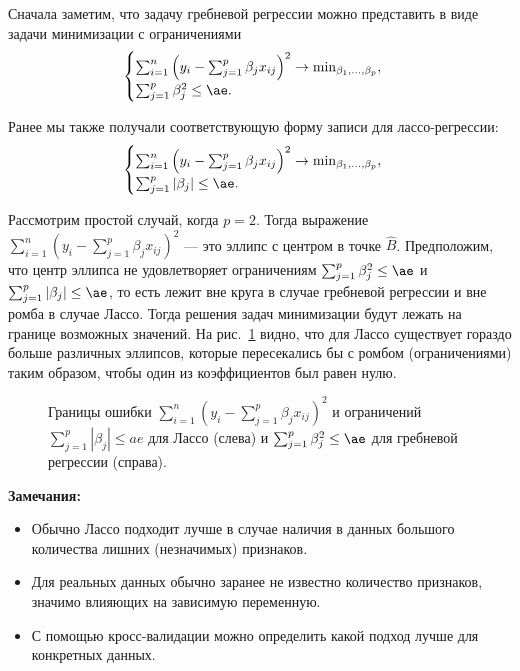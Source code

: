 \documentclass[11pt,colorlinks=true]{article}
\begin{document}
Сначала заметим, что задачу гребневой регрессии можно  представить в виде задачи минимизации с ограничениями
\begin{equation*}
\begin{cases}
\sum_{i=1}^{n}
\left(
y_{i}
-
\sum_{j=1}^{p}\beta_{j}x_{ij}
\right)^{2}
\to
\min_{\beta_{1},\ldots,\beta_{p}},\\
\sum_{j=1}^{p}\beta_{j}^{2}\leq\ae.
\end{cases}
\end{equation*}


Ранее мы также получали соответствующую форму записи для лассо-регрессии:
\begin{equation*}%
\begin{cases}
\sum_{i=1}^{n}
\left(
y_{i}
-
\sum_{j=1}^{p}\beta_{j}x_{ij}
\right)^{2}
\to
\min_{\beta_{1},\ldots,\beta_{p}},\\
\sum_{j=1}^{p}|\beta_{j}|\leq\ae.
\end{cases}
\end{equation*}

Рассмотрим простой случай, когда $p = 2$. Тогда выражение $\sum_{i=1}^n(y_i - \sum_{j=1}^p \beta_j x_{ij})^2$ --- это эллипс с центром в точке $\hat{B}$. Предположим, что центр эллипса не удовлетворяет ограничениям $\sum_{j = 1}^p \beta_j^2 \leq\ae$ и $\sum_{j = 1}^p |\beta_j| \leq \ae$, то есть лежит вне круга в случае гребневой регрессии и вне ромба в случае Лассо. Тогда решения задач минимизации будут лежать на границе возможных значений. На рис.~\ref{lasso_pic} видно, что для Лассо существует гораздо больше различных эллипсов, которые пересекались бы с ромбом (ограничениями) таким образом, чтобы один из коэффициентов был равен нулю.

\begin{figure}[h]
\label{lasso_pic}
\caption{Границы ошибки $\sum_{i=1}^n(y_i - \sum_{j=1}^p \beta_j x_{ij})^2$ и ограничений  $\sum_{j = 1}^p |\beta_j| \leq ae$ для Лассо (слева) и $\sum_{j = 1}^p \beta_j^2 \leq \ae$ для гребневой регрессии (справа).}
\label{lasso_pic}
\end{figure}

\textbf{Замечания:}
\begin{itemize}
\item Обычно Лассо подходит лучше в случае наличия в данных большого количества лишних (незначимых) признаков.
\item Для реальных данных обычно заранее не известно количество признаков, значимо влияющих на зависимую переменную.
\item С помощью кросс-валидации можно определить какой подход лучше для конкретных данных.
\end{itemize}
\end{document}
